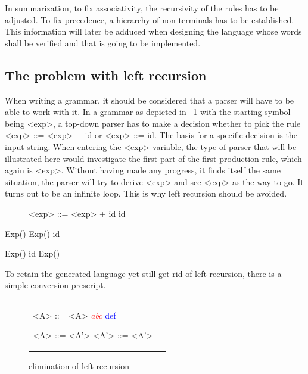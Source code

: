 In summarization, to fix associativity, the recursivity of the rules has to be adjusted. To fix precedence, a hierarchy of non-terminals has to be established. This information will later be adduced when designing the language whose words shall be verified and that is going to be implemented.

\subsection{The problem with left recursion}

When writing a grammar, it should be considered that a parser will have to be able to work with it. In a grammar as depicted in ~\ref{grammarLR} with the starting symbol being <exp>, a top-down parser has to make a decision whether to pick the rule <exp> ::= <exp> + id or <exp> ::= id. The basis for a specific decision is the input string. When entering the <exp> variable, the type of parser that will be illustrated here would investigate the first part of the first production rule, which again is <exp>. Without having made any progress, it finds itself the same situation, the parser will try to derive <exp> and see <exp> as the way to go. It turns out to be an infinite loop. This is why left recursion should be avoided.

\begin{figure}
	\label{grammarLR}

	\begin{grammar}
		<exp> ::= <exp> + id
		\alt id
	\end{grammar}
\end{figure}

Exp()
{
	Exp()
	id
}

Exp()
{
	id
	Exp()
}

To retain the generated language yet still get rid of left recursion, there is a simple conversion prescript.

\begin{figure}
	\label{ambGrammarPrecFixedTree}
	\caption{elimination of left recursion}
	
	\begin{center}
		\begin{tabular}{p{5cm} p{5cm}}
			\begin{grammar}
				<A> ::= <A> \textcolor{red}{\textit{abc}}
				\alt \textcolor{blue}{def}
			\end{grammar}
			\begin{grammar}
				<A> ::= \textcolor{blue}{\beta} <A'>
				<A'> ::= \textcolor{red}{\alpha} <A'>
				\alt \epsilon
			\end{grammar}
		\end{tabular}
	\end{center}
\end{figure}

